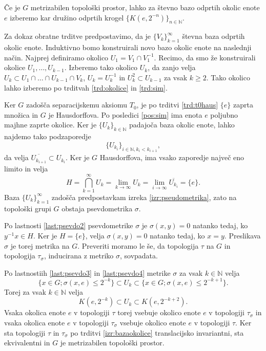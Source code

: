 \documentclass[mat1]{fmfdelo}
\newcommand{\N}{\mathbb N}
\newcommand{\closure}[1]{\overline{#1}}
\begin{document}
\begin{dokaz}
Če je $G$ metrizabilen topološki prostor, lahko za števno bazo odprtih okolic enote $e$ izberemo kar družino odprtih krogel $\lbrace K(e, 2^{-n}) \rbrace_{n \in \N}$.

Za dokaz obratne trditve predpostavimo, da je $\lbrace V_k \rbrace_{k = 1}^\infty$ števna baza odprtih okolic enote. Induktivno bomo konstruirali novo bazo okolic enote na naslednji način. Najprej definiramo okolico $U_1 = V_1 \cap V_1^{-1}$. Recimo, da smo že konstruirali okolice $U_1,\dots,U_{k-1}$. Izberemo tako okolico $U_k$, da zanjo velja $U_k \subset U_1 \cap \dots \cap U_{k-1}\cap V_k$, $U_k = U_k^{-1}$ in $U_k^2 \subset U_{k-1}$ za vsak $k \geq 2$. Tako okolico lahko izberemo po trditvah \ref{trd:okolice} in \ref{trd:sim}.

Ker $G$ zadošča separacijskemu aksiomu $T_0$, je po trditvi \ref{trd:t0haus} $\lbrace e \rbrace$ zaprta množica in $G$ je Hausdorffova. Po posledici \ref{pos:sim} ima enota $e$ poljubno majhne zaprte okolice. Ker je $\lbrace U_k \rbrace_{k \in \N}$ padajoča baza okolic enote, lahko najdemo tako podzaporedje \[\lbrace U_{k_i} \rbrace_{i \in \N, k_i < k_{i+1}},\] da velja $\closure{U_{k_{i+1}}} \subset U_{k_i}$. Ker je $G$ Hausdorffova, ima vsako zaporedje največ eno limito in velja
\[ H = \bigcap_{k=1}^\infty U_k = \lim_{k \to \infty}U_k = \lim_{i \to \infty} \closure{U_{k_i}} = \lbrace e \rbrace. \]
 Baza $\lbrace U_k \rbrace_{k = 1}^\infty$ zadošča predpostavkam izreka \ref{izr:pseudometrika}, zato na topološki grupi $G$ obstaja psevdometrika $\sigma$.

Po lastnosti \ref{last:psevdo2} psevdometrike $\sigma$ je $\sigma(x, y) = 0$ natanko tedaj, ko $y^{-1}x \in H$. Ker je $H = \lbrace e \rbrace$, velja $\sigma(x, y) = 0$ natanko tedaj, ko $x = y$. Preslikava $\sigma$ je torej metrika na $G$. Preveriti moramo le še, da topologija $\tau$ na $G$ in topologija $\tau_\sigma$, inducirana z metriko $\sigma$, sovpadata.

Po lastnostiih \ref{last:psevdo3} in \ref{last:psevdo4} metrike $\sigma$ za vsak $k \in \N$ velja
\[ \lbrace x \in G ; \sigma(x, e) \leq 2^{-k} \rbrace \subset U_k \subset \lbrace x \in G ; \sigma(x, e) \leq 2^{-k+1} \rbrace.\]
Torej za vsak $k \in \N$ velja
\[ K(e, 2^{-k}) \subset U_k \subset K(e, 2^{-k+2}). \]
Vsaka okolica enote $e$ v topologiji $\tau$ torej vsebuje okolico enote $e$ v topologiji $\tau_\sigma$ in vsaka okolica enote $e$ v topologiji $\tau_\sigma$ vsebuje okolico enote $e$ v topologiji $\tau$.
Ker sta topologiji $\tau$ in $\tau_\sigma$ po trditvi \ref{izr:bazaokolice} translacijsko invariantni, sta ekvivalentni in $G$ je metrizabilen topološki prostor.
\end{dokaz}
\end{document}
